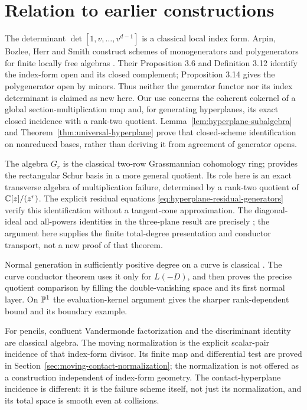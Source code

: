 \section{Relation to earlier constructions}
\label{sec:finite-prior-comparison}
The determinant $\det[1,v,\ldots,v^{d-1}]$ is a classical local
index form. Arpin, Bozlee, Herr and Smith construct schemes of
monogenerators and polygenerators for finite locally free algebras
\cite{ABHS}. Their Proposition 3.6 and Definition 3.12 identify the
index-form open and its closed complement; Proposition 3.14 gives
the polygenerator open by minors. Thus neither the generator functor
nor its index determinant is claimed as new here. Our use concerns
the coherent cokernel of a global section-multiplication map and,
for generating hyperplanes, its exact closed incidence with a
rank-two quotient. Lemma~\ref{lem:hyperplane-subalgebra} and
Theorem~\ref{thm:universal-hyperplane} prove that closed-scheme
identification on nonreduced bases, rather than deriving it from
agreement of generator opens.

The algebra $G_r$ is the classical two-row Grassmannian cohomology
ring; \cite[Theorem 2.7]{Grinberg} provides the rectangular Schur
basis in a more general quotient. Its role here is an exact
transverse algebra of multiplication failure, determined by a
rank-two quotient of $\mathbb C[z]/(z^r)$. The explicit residual equations
\eqref{eq:hyperplane-residual-generators} verify this identification
without a tangent-cone approximation. The diagonal-ideal and
all-powers identities in the three-plane result are precisely
\cite[Corollary 3.8.3]{Haiman}; the argument here supplies the
finite total-degree presentation and conductor transport, not a
new proof of that theorem.

Normal generation in sufficiently positive degree on a curve is
classical \cite{GL86}. The curve conductor theorem uses it only for
$L(-D)$, and then proves the precise quotient comparison by filling
the double-vanishing space and its first normal layer. On $\mathbb P^1$
the evaluation-kernel argument gives the sharper rank-dependent
bound and its boundary example.

For pencils, confluent Vandermonde factorization and the discriminant
identity are classical algebra. The moving normalization is the
explicit scalar-pair incidence of that index-form divisor. Its
finite map and differential test are proved in
Section~\ref{sec:moving-contact-normalization}; the normalization
is not offered as a construction independent of index-form geometry.
The contact-hyperplane incidence is different: it is the failure
scheme itself, not just its normalization, and its total space is
smooth even at collisions.

